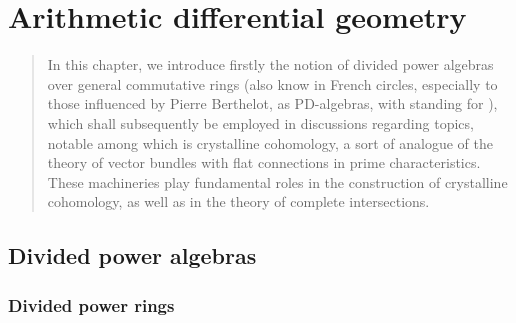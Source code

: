 \chapter{Arithmetic differential geometry} \label{chapter: crystals}
    \begin{abstract}
        In this chapter, we introduce firstly the notion of divided power algebras over general commutative rings (also know in French circles, especially to those influenced by Pierre Berthelot, as PD-algebras, with  standing for ), which shall subsequently be employed in discussions regarding topics, notable among which is crystalline cohomology, a sort of analogue of the theory of vector bundles with flat connections in prime characteristics. These machineries play fundamental roles in the construction of crystalline cohomology, as well as in the theory of complete intersections. 
    \end{abstract}
    
    \minitoc
    
    \section{Divided power algebras}
        \subsection{Divided power rings}
